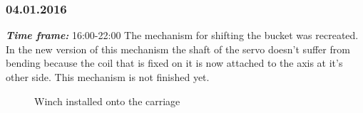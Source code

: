 \subsubsection{04.01.2016}
\textit{\textbf{Time frame:}} 16:00-22:00 \newline
The mechanism for shifting the bucket was recreated. In the new version of this mechanism the shaft of the servo doesn't suffer from bending because the coil that is fixed on it is now attached to the axis at it's other side. This mechanism is not finished yet.

\begin{figure}[H]
	\begin{minipage}[h]{0.58\linewidth}
		\caption{Winch installed onto the carriage}
	\end{minipage}
	\hfill
	\begin{minipage}[h]{0.37\linewidth}

\end{minipage}
\end{figure}
